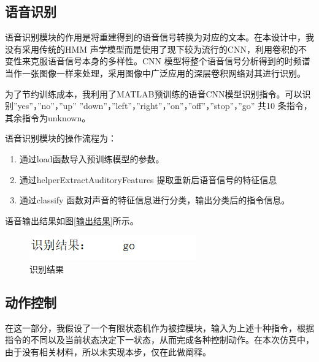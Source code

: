 \documentclass{../source/zju}
\begin{document}
    \subsection{语音识别}
        语音识别模块的作用是将重建得到的语音信号转换为对应的文本。在本设计中，我没有采用传统的HMM 声学模型而是使用了现下较为流行的CNN，利用卷积的不变性来克服语音信号本身的多样性。CNN 模型将整个语音信号分析得到的时频谱当作一张图像一样来处理，采用图像中广泛应用的深层卷积网络对其进行识别。

        为了节约训练成本，我利用了MATLAB预训练的语音CNN模型识别指令。可以识别”yes”，”no”，”up” ”down”，”left”，”right”，”on”，”off”，”stop”，”go” 共10 条指令，其余指令为unknown。

        语音识别模块的操作流程为：
        \begin{enumerate}
            \item 通过load函数导入预训练模型的参数。
            \item 通过helperExtractAuditoryFeatures 提取重新后语音信号的特征信息
            \item 通过classify 函数对声音的特征信息进行分类，输出分类后的指令信息。
        \end{enumerate}
        语音输出结果如图\ref{输出结果}所示。
        \begin{figure}[H]
            \centering
            \includegraphics[]{figure/识别结果.png}
            \caption{识别结果}
            \label{识别结果}
        \end{figure}

    \subsection{动作控制}
        在这一部分，我假设了一个有限状态机作为被控模块，输入为上述十种指令，根据指令的不同以及当前状态决定下一状态，从而完成各种控制动作。在本次仿真中，由于没有相关材料，所以未实现本步，仅在此做阐释。
\end{document}

